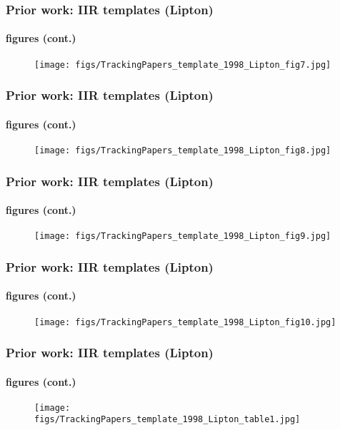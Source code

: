 \begin{frame}
\frametitle{Prior work: IIR templates (Lipton)}
\framesubtitle{figures (cont.)}
\mypagenum
{}
	\begin{figure}
		\texttt{[image: figs/TrackingPapers\_template\_1998\_Lipton\_fig7.jpg]}
	\end{figure}
\end{frame}



\begin{frame}
\frametitle{Prior work: IIR templates (Lipton)}
\framesubtitle{figures (cont.)}
\mypagenum
{}
	\begin{figure}
		\texttt{[image: figs/TrackingPapers\_template\_1998\_Lipton\_fig8.jpg]}
	\end{figure}
\end{frame}



\begin{frame}
\frametitle{Prior work: IIR templates (Lipton)}
\framesubtitle{figures (cont.)}
\mypagenum
{}
	\begin{figure}
		\texttt{[image: figs/TrackingPapers\_template\_1998\_Lipton\_fig9.jpg]}
	\end{figure}
\end{frame}



\begin{frame}
\frametitle{Prior work: IIR templates (Lipton)}
\framesubtitle{figures (cont.)}
\mypagenum
{}
	\begin{figure}
		\texttt{[image: figs/TrackingPapers\_template\_1998\_Lipton\_fig10.jpg]}
	\end{figure}
\end{frame}



\begin{frame}
\frametitle{Prior work: IIR templates (Lipton)}
\framesubtitle{figures (cont.)}
\mypagenum
{}
	\begin{figure}
		\texttt{[image: figs/TrackingPapers\_template\_1998\_Lipton\_table1.jpg]}
	\end{figure}
\end{frame}


